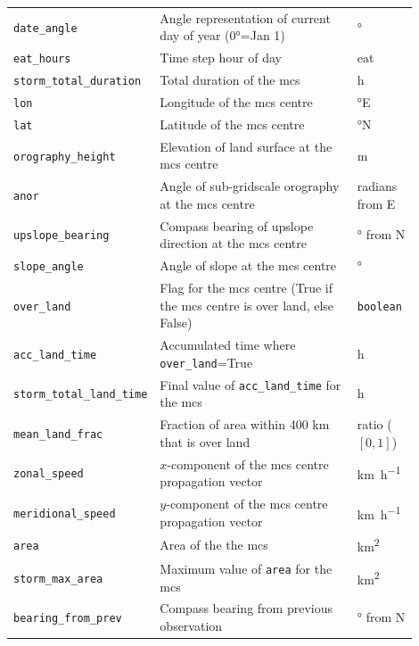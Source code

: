{\begin{longtable}{>{\raggedright\arraybackslash}p{0.25\linewidth} p{0.50\linewidth} >{\raggedright\arraybackslash}p{0.15\linewidth}}
    \multicolumn{3}{c}{\textit{Geographic and temporal features}} \\
    \midrule
    \texttt{date\_angle} & Angle representation of current day of year (\ang{0}=Jan 1) & \unit{\degree} \\
    \texttt{eat\_hours} & Time step hour of day & \acrlong{eat} \\
    \texttt{storm\_total\_duration} & Total duration of the \acrshort{mcs} & \unit{\hour} \\
    \texttt{lon} & Longitude of the \acrshort{mcs} centre & \unit{\degree}E \\
    \texttt{lat} & Latitude of the \acrshort{mcs} centre & \unit{\degree}N \\
    \texttt{orography\_height} & Elevation of land surface at the \acrshort{mcs} centre & \unit{\meter} \\
    \texttt{anor} & Angle of sub-gridscale orography at the \acrshort{mcs} centre & radians from E \\
    \texttt{upslope\_bearing} & Compass bearing of upslope direction at the \acrshort{mcs} centre & \unit{\degree} from  N \\
    \texttt{slope\_angle} & Angle of slope at the \acrshort{mcs} centre & \unit{\degree} \\
    \texttt{over\_land} & Flag for the \acrshort{mcs} centre (True if the \acrshort{mcs} centre is over land, else False) & \texttt{boolean} \\
    \texttt{acc\_land\_time} & Accumulated time where \texttt{over\_land}=True & \unit{\hour} \\
    \texttt{storm\_total\_land\_time} & Final value of \texttt{acc\_land\_time} for the \acrshort{mcs} & \unit{\hour} \\
    \texttt{mean\_land\_frac} & Fraction of area within 400 km that is over land & ratio ($[0,1]$) \\
    \texttt{zonal\_speed} & $x$-component of the \acrshort{mcs} centre propagation vector & \unit{\km\per\hour} \\
    \texttt{meridional\_speed} & $y$-component of the \acrshort{mcs} centre propagation vector & \unit{\km\per\hour} \\
    \texttt{area} & Area of the the \acrshort{mcs} & \unit{\km\squared} \\
    \texttt{storm\_max\_area} & Maximum value of \texttt{area} for the \acrshort{mcs} & \unit{\km\squared} \\
    \texttt{bearing\_from\_prev} & Compass bearing from previous observation & \unit{\degree} from  N \\

\end{longtable}}
